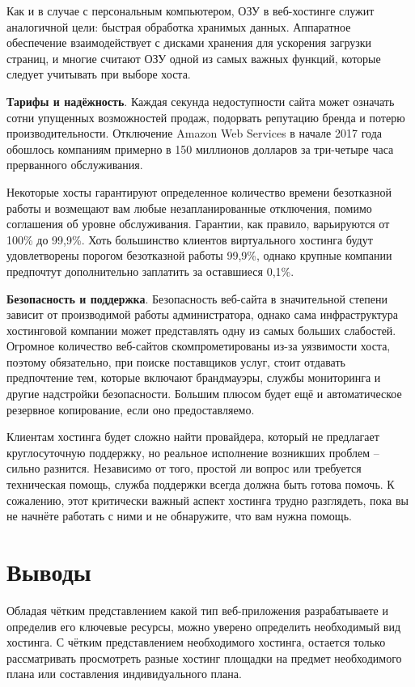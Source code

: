 Как и в случае с персональным компьютером, ОЗУ в веб-хостинге служит аналогичной цели: быстрая обработка хранимых данных. Аппаратное обеспечение взаимодействует с дисками хранения для ускорения загрузки страниц, и многие считают ОЗУ одной из самых важных функций, которые следует учитывать при выборе хоста.

\textbf{Тарифы и надёжность}. Каждая секунда недоступности сайта\cite{HowMuchD49:online} может означать сотни упущенных возможностей продаж, подорвать репутацию бренда и потерю производительности. Отключение Amazon Web Services в начале 2017 года обошлось компаниям примерно в 150 миллионов долларов\cite{AmazonAn66:online} за три-четыре часа прерванного обслуживания.

Некоторые хосты гарантируют определенное количество времени безотказной работы и возмещают вам любые незапланированные отключения, помимо соглашения об уровне обслуживания. Гарантии, как правило, варьируются от 100\% до 99,9\%. Хоть большинство клиентов виртуального хостинга будут удовлетворены порогом безотказной работы 99,9\%, однако крупные компании предпочтут дополнительно заплатить за оставшиеся 0,1\%.

\textbf{Безопасность и поддержка}. Безопасность веб-сайта в значительной степени зависит от производимой работы администратора, однако  сама инфраструктура хостинговой компании может представлять одну из самых больших слабостей. Огромное количество веб-сайтов скомпрометированы из-за уязвимости хоста, поэтому обязательно, при поиске поставщиков услуг, стоит отдавать предпочтение тем, которые включают брандмауэры, службы мониторинга и другие надстройки безопасности. Большим плюсом будет ещё и автоматическое резервное копирование, если оно предоставляемо. 

Клиентам хостинга будет сложно найти провайдера, который не предлагает круглосуточную поддержку, но реальное исполнение возникших проблем – сильно разнится. Независимо от того, простой ли вопрос или требуется техническая помощь, служба поддержки всегда должна быть готова помочь. К сожалению, этот критически важный аспект хостинга трудно разглядеть, пока вы не начнёте работать с ними и не обнаружите, что вам нужна помощь. 


\section{Выводы} 
\label{ch2:conclusion}

Обладая чётким представлением какой тип веб-приложения разрабатываете и определив его ключевые ресурсы, можно уверено определить необходимый вид хостинга. С чётким представлением необходимого хостинга, остается только рассматривать просмотреть разные хостинг площадки на предмет необходимого плана или составления индивидуального плана. 

